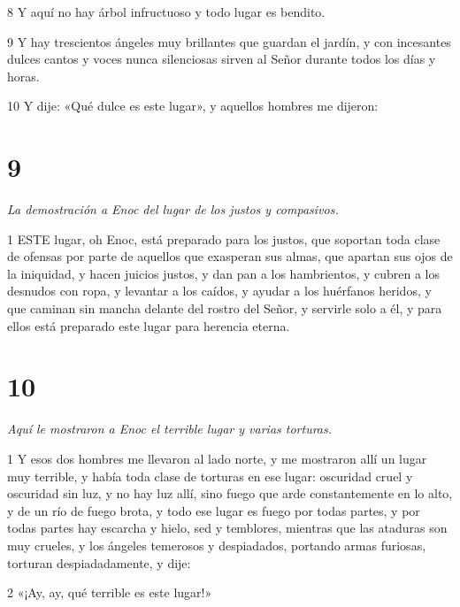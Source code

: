 \par 8 Y aquí no hay árbol infructuoso y todo lugar es bendito.

\par 9 Y hay trescientos ángeles muy brillantes que guardan el jardín, y con incesantes dulces cantos y voces nunca silenciosas sirven al Señor durante todos los días y horas.

\par 10 Y dije: «Qué dulce es este lugar», y aquellos hombres me dijeron:

\chapter{9}

\par \textit{La demostración a Enoc del lugar de los justos y compasivos.}

\par 1 ESTE lugar, oh Enoc, está preparado para los justos, que soportan toda clase de ofensas por parte de aquellos que exasperan sus almas, que apartan sus ojos de la iniquidad, y hacen juicios justos, y dan pan a los hambrientos, y cubren a los desnudos con ropa, y levantar a los caídos, y ayudar a los huérfanos heridos, y que caminan sin mancha delante del rostro del Señor, y servirle solo a él, y para ellos está preparado este lugar para herencia eterna.

\chapter{10}

\par \textit{Aquí le mostraron a Enoc el terrible lugar y varias torturas.}

\par 1 Y esos dos hombres me llevaron al lado norte, y me mostraron allí un lugar muy terrible, y había toda clase de torturas en ese lugar: oscuridad cruel y oscuridad sin luz, y no hay luz allí, sino fuego que arde constantemente en lo alto, y de un río de fuego brota, y todo ese lugar es fuego por todas partes, y por todas partes hay escarcha y hielo, sed y temblores, mientras que las ataduras son muy crueles, y los ángeles temerosos y despiadados, portando armas furiosas, torturan despiadadamente, y dije:

\par 2 «¡Ay, ay, qué terrible es este lugar!»

